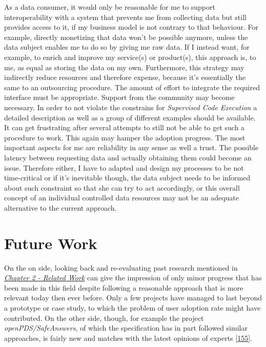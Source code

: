 \documentclass[12pt,english,a4paper,titlepage,cleardoublepage=empty,dottedtoc]{report}
\begin{document}
As a data consumer, it would only be reasonable for me to support
interoperability with a system that prevents me from collecting data but
still provides access to it, if my business model is not contrary to
that behaviour. For example, directly monetizing that data won't be
possible anymore, unless the data subject enables me to do so by giving
me raw data. If I instead want, for example, to enrich and improve my
service(s) or product(s), this approach is, to me, as equal as storing
the data on my own. Furthermore, this strategy may indirectly reduce
resources and therefore expense, because it's essentially the same to an
outsourcing procedure. The amount of effort to integrate the required
interface must be appropriate. Support from the community may become
necessary. In order to not violate the constrains for \emph{Supervised
Code Execution} a detailed description as well as a group of different
examples should be available. It can get frustrating after several
attempts to still not be able to get such a procedure to work. This
again may hamper the adoption progress. The most important aspects for
me are reliability in any sense as well a trust. The possible latency
between requesting data and actually obtaining them could become an
issue. Therefore either, I have to adapted and design my processes to be
not time-critical or if it's inevitable though, the data subject needs
to be informed about such constraint so that she can try to act
accordingly, or this overall concept of an individual controlled data
resources may not be an adequate alternative to the current approach.

\section{Future Work}\label{future-work}

On the on side, looking back and re-evaluating past research mentioned
in \emph{\protect\hyperlink{related-work}{Chapter 2 - Related Work}} can
give the impression of only minor progress that has been made in this
field despite following a reasonable approach that is more relevant
today then ever before. Only a few projects have managed to last beyond
a prototype or case study, to which the problem of user adoption rate
might have contributed. On the other side, though, for example the
project \emph{openPDS/SafeAnswers}, of which the specification has in
part followed similar approaches, is fairly new and matches with the
latest opinions of experts
{[}\protect\hyperlink{ref-web_2017_distributed-future-is-personal}{155}{]}.
\end{document}
